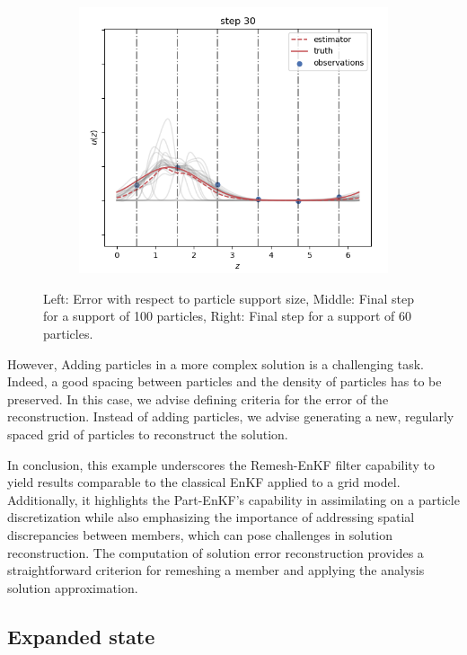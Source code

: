 \begin{figure}
\begin{subfigure}{0.29\textwidth}
		\includegraphics[width=\textwidth]{images/app1d/error_support/not_ok.png}
		\label{error_support3}
	\end{subfigure}
	\caption{Left: Error with respect to particle support size, Middle: Final step for a support of 100 particles, Right: Final step for a support of 60 particles.}
	\label{error_support}
\end{figure}
However, Adding particles in a more complex solution is a challenging task. Indeed, a good spacing between particles and the density of particles has to be preserved. In this case, we advise defining criteria for the error of the reconstruction. Instead of adding particles, we advise generating a new, regularly spaced grid of particles to reconstruct the solution.

In conclusion, this example underscores the Remesh-EnKF filter capability to yield results comparable to the classical EnKF applied to a grid model. Additionally, it highlights the Part-EnKF's capability in assimilating on a particle discretization while also emphasizing the importance of addressing spatial discrepancies between members, which can pose challenges in solution reconstruction. The computation of solution error reconstruction provides a straightforward criterion for remeshing a member and applying the analysis solution approximation.

\subsection{Expanded state}

